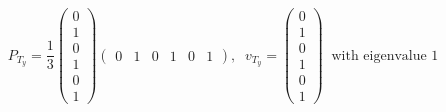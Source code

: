 \documentclass[]{ctexart}
\begin{document}
\begin{equation*}
P_{T_y}=\frac{1}{3}\begin{pmatrix}
0\\1\\0\\1\\0\\1
\end{pmatrix}\begin{pmatrix}
0 & 1&0&1&0&1
\end{pmatrix},\;\;v_{T_y}=\begin{pmatrix}
0\\1\\0\\1\\0\\1
\end{pmatrix}\;\;\text{with eigenvalue 1}
\end{equation*}
\end{document}
